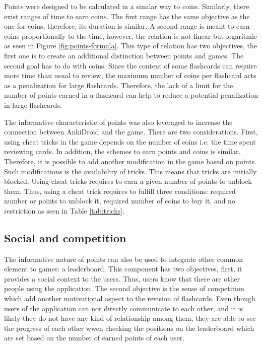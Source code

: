 Points were designed to be calculated in a similar way to coins. Similarly, there exist ranges of time to earn coins. The first range has the same objective as the one for coins, therefore, its duration is similar. A second range is meant to earn coins proportionally to the time, however, the relation is not linear but logaritmic as seen in Figure \ref{fig:points-formula}. This type of relation has two objectives, the first one is to create an additional distinction between points and games. The second goal has to do with coins. Since the content of some flashcards can require more time than usual to review, the maximum number of coins per flashcard acts as a penalization for large flashcards. Therefore, the lack of a limit for the number of points earned in a flashcard can help to reduce a potential penalization in large flashcards.

The informative characteristic of points was also leveraged to increase the connection between AnkiDroid and the game. There are two considerations. First, using cheat tricks in the game depends on the number of coins i.e. the time spent reviewing cards. In addition, the schemes to earn points and coins is similar. Therefore, it is possible to add another modification in the game based on points. Such modifications is the availability of tricks. This means that tricks are initially blocked. Using cheat tricks requires to earn a given number of points to unblock them. Thus, using a cheat trick requires to fulfill three conditions: required number or points to unblock it, required number of coins to buy it, and no restriction as seen in Table \ref{tab:tricks}.

\subsection{Social and competition}
The informative nature of points can also be used to integrate other common element to games: a leaderboard. This component has two objectives, first, it provides a social context to the users. Thus, users know that there are other people using the application. The second objective is the sense of competition which add another motivational aspect to the revision of flashcards. Even though users of the application can not directly communicate to each other, and it is likely they do not have any kind of relationship among them, they are able to see the progress of each other wwen checking the positions on the leaderboard which are set based on the number of earned points of each user.


